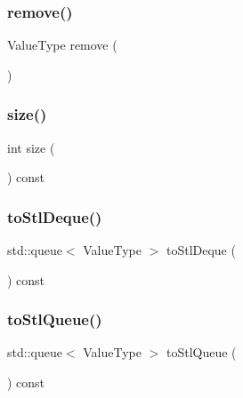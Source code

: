 \mbox{\label{classQueue_a025ec97fa5b04552f5ad0902c1f02ac1}} 
\subsubsection{\texorpdfstring{remove()}{remove()}}
{\footnotesize\ttfamily Value\+Type remove (\begin{DoxyParamCaption}{ }\end{DoxyParamCaption})}

\mbox{\label{classQueue_af9593d4a5ff4274efaf429cb4f9e57cc}} 
\subsubsection{\texorpdfstring{size()}{size()}}
{\footnotesize\ttfamily int size (\begin{DoxyParamCaption}{ }\end{DoxyParamCaption}) const}

\mbox{\label{classQueue_ac7bd339ad0d8fdd48a18540a5046e7de}} 
\subsubsection{\texorpdfstring{to\+Stl\+Deque()}{toStlDeque()}}
{\footnotesize\ttfamily std\+::queue$<$ Value\+Type $>$ to\+Stl\+Deque (\begin{DoxyParamCaption}{ }\end{DoxyParamCaption}) const}

\mbox{\label{classQueue_a81f999520c8e0cc10ab34041ad56fad2}} 
\subsubsection{\texorpdfstring{to\+Stl\+Queue()}{toStlQueue()}}
{\footnotesize\ttfamily std\+::queue$<$ Value\+Type $>$ to\+Stl\+Queue (\begin{DoxyParamCaption}{ }\end{DoxyParamCaption}) const}

